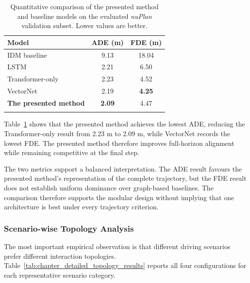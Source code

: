 \begin{table}
\caption{Quantitative comparison of the presented method and baseline models on the evaluated \textit{nuPlan} validation subset. Lower values are better.\label{tab:chapter_quantitative_results}}{%
\begin{tabular}{@{}lcc@{}}
\toprule
\textbf{Model} & \textbf{ADE (m)} & \textbf{FDE (m)} \\
\midrule
IDM baseline      & 9.13 & 18.04 \\
LSTM              & 2.21 & 6.50 \\
Transformer-only  & 2.23 & 4.52 \\
VectorNet         & 2.19 & \textbf{4.25} \\
\textbf{The presented method}   & \textbf{2.09} & 4.47 \\
\botrule
\end{tabular}}{}
\end{table}

Table~\ref{tab:chapter_quantitative_results} shows that the presented method achieves the lowest ADE, reducing the Transformer-only result from 2.23 m to 2.09 m, while VectorNet records the lowest FDE. The presented method therefore improves full-horizon alignment while remaining competitive at the final step.

The two metrics support a balanced interpretation. The ADE result favours the presented method's representation of the complete trajectory, but the FDE result does not establish uniform dominance over graph-based baselines. The comparison therefore supports the modular design without implying that one architecture is best under every trajectory criterion.

\subsubsection{Scenario-wise Topology Analysis}
\label{subsubsec:magnet_topology_results}

The most important empirical observation is that different driving scenarios prefer different interaction topologies. Table~\ref{tab:chapter_detailed_topology_results} reports all four configurations for each representative scenario category.


